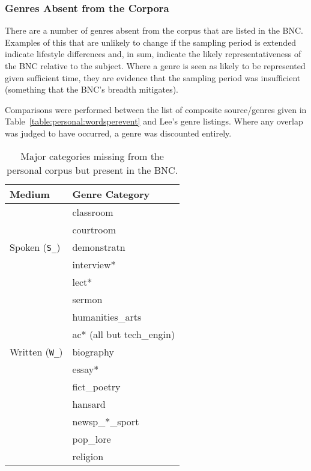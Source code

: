 \subsubsection{Genres Absent from the Corpora}
There are a number of genres absent from the corpus that are listed in the BNC.  Examples of this that are unlikely to change if the sampling period is extended indicate lifestyle differences and, in sum, indicate the likely representativeness of the BNC relative to the subject.  Where a genre is seen as likely to be represented given sufficient time, they are evidence that the sampling period was insufficient (something that the BNC's breadth mitigates).

Comparisons were performed between the list of composite source/genres given in Table~\ref{table:personal:wordsperevent} and Lee's genre listings.  Where any overlap was judged to have occurred, a genre was discounted entirely.


\begin{table}[ht]
    \centering

    \begin{tabular}{ |l|l| }
        \hline
        Medium & Genre Category \\ \hline
        \multirow{5}{*}{Spoken (\texttt{S\_})} 
                                & classroom \\
                                & courtroom \\
                                & demonstratn \\
                                & interview* \\
                                & lect* \\
                                & sermon \\
        \hline
        \multirow{5}{*}{Written (\texttt{W\_})} 
                                & humanities\_arts \\
                                & ac* (all but tech\_engin) \\
                                & biography \\
                                & essay* \\
                                & fict\_poetry \\
                                & hansard \\
                                & newsp\_*\_sport \\
                                & pop\_lore \\
                                & religion \\
        \hline
    \end{tabular}
    \caption{Major categories missing from the personal corpus but present in the BNC.}
    \label{table:personal:missingcatspersonal}
\end{table}


